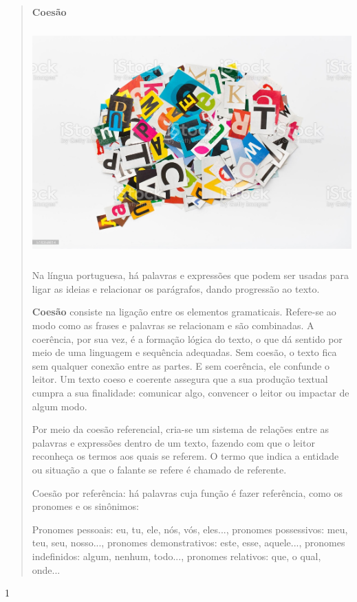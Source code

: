 \begin{escolha}
\begin{escolha}
{\begin{quote}
\textbf{Coesão }

\includegraphics[width=5.17173in,height=3.44883in]{media/image35.jpeg}

Na língua portuguesa, há palavras e expressões que podem ser usadas para
ligar as ideias e relacionar os parágrafos, dando progressão ao texto.

\textbf{Coesão} consiste na ligação entre os elementos gramaticais.
Refere-se ao modo como as frases e palavras se relacionam e são
combinadas. A coerência, por sua vez, é a formação lógica do texto, o
que dá sentido por meio de uma linguagem e sequência adequadas. Sem
coesão, o texto fica sem qualquer conexão entre as partes. E sem
coerência, ele confunde o leitor. Um texto coeso e coerente assegura que
a sua produção textual cumpra a sua finalidade: comunicar algo,
convencer o leitor ou impactar de algum modo.

Por meio da coesão referencial, cria-se um sistema de relações entre as
palavras e expressões dentro de um texto, fazendo com que o leitor
reconheça os termos aos quais se referem. O termo que indica a entidade
ou situação a que o falante se refere é chamado de referente.

Coesão por referência: há palavras cuja função é fazer referência, como
os pronomes e os sinônimos:

Pronomes pessoais: eu, tu, ele, nós, vós, eles..., pronomes possessivos:
meu, teu, seu, nosso..., pronomes demonstrativos: este, esse, aquele...,
pronomes indefinidos: algum, nenhum, todo..., pronomes relativos: que, o
qual, onde...
\end{quote}


\num{1}

}
\end{escolha}
\end{escolha}
